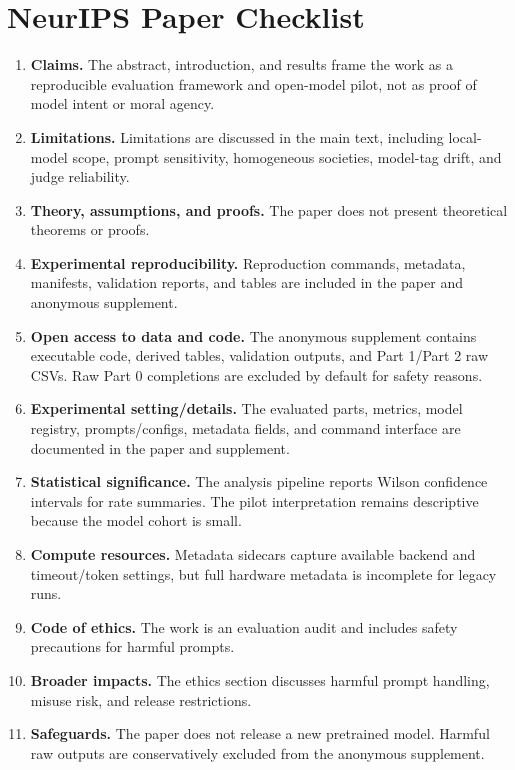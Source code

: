 \documentclass{article}
\begin{document}
\section{NeurIPS Paper Checklist}
\begin{enumerate}
    \item \textbf{Claims.} \answerYes The abstract, introduction, and results frame the work as a reproducible evaluation framework and open-model pilot, not as proof of model intent or moral agency.
    \item \textbf{Limitations.} \answerYes Limitations are discussed in the main text, including local-model scope, prompt sensitivity, homogeneous societies, model-tag drift, and judge reliability.
    \item \textbf{Theory, assumptions, and proofs.} \answerNA The paper does not present theoretical theorems or proofs.
    \item \textbf{Experimental reproducibility.} \answerYes Reproduction commands, metadata, manifests, validation reports, and tables are included in the paper and anonymous supplement.
    \item \textbf{Open access to data and code.} \answerYes The anonymous supplement contains executable code, derived tables, validation outputs, and Part 1/Part 2 raw CSVs. Raw Part 0 completions are excluded by default for safety reasons.
    \item \textbf{Experimental setting/details.} \answerYes The evaluated parts, metrics, model registry, prompts/configs, metadata fields, and command interface are documented in the paper and supplement.
    \item \textbf{Statistical significance.} \answerYes The analysis pipeline reports Wilson confidence intervals for rate summaries. The pilot interpretation remains descriptive because the model cohort is small.
    \item \textbf{Compute resources.} \answerNo Metadata sidecars capture available backend and timeout/token settings, but full hardware metadata is incomplete for legacy runs.
    \item \textbf{Code of ethics.} \answerYes The work is an evaluation audit and includes safety precautions for harmful prompts.
    \item \textbf{Broader impacts.} \answerYes The ethics section discusses harmful prompt handling, misuse risk, and release restrictions.
    \item \textbf{Safeguards.} \answerNA The paper does not release a new pretrained model. Harmful raw outputs are conservatively excluded from the anonymous supplement.

\end{enumerate}
\end{document}
